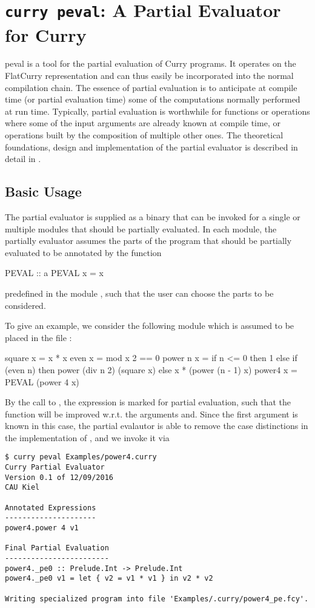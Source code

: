 \section{\texttt{curry peval}: A Partial Evaluator for Curry}
\label{sec-peval}

peval
is a tool for the partial evaluation of Curry programs.
It operates on the FlatCurry representation and can thus
easily be incorporated into the normal compilation chain.
The essence of partial evaluation is to anticipate at compile time
(or partial evaluation time) some of the computations
normally performed at run time.
Typically, partial evaluation is worthwhile for functions or
operations where some of the input arguments are already known at compile time,
or operations built by the composition of multiple other ones.
The theoretical foundations, design and implementation of
the partial evaluator is described in detail in \cite{Peemoeller2016}.

\subsection{Basic Usage}

The partial evaluator is supplied as a binary that can be invoked
for a single or multiple modules that should be partially evaluated.
In each module, the partially evaluator assumes the parts of the program
that should be partially evaluated to be annotated by the function
\begin{curry}
PEVAL :: a
PEVAL x = x
\end{curry}
predefined in the module ,
such that the user can choose the parts to be considered.

To give an example, we consider the following module which is assumed
to be placed in the file :
\begin{curry}
square  x = x * x
even    x = mod x 2 == 0
power n x = if n <= 0 then 1
                      else if (even n) then power (div n 2) (square x)
                                       else x * (power (n - 1) x)
power4  x = PEVAL (power 4 x)
\end{curry}
By the call to , the expression 
is marked for partial evaluation, such that the function 
will be improved w.r.t. the arguments  and.
Since the first argument is known in this case,
the partial evalautor is able to remove the case distinctions
in the implementation of , and we invoke it via
\begin{lstlisting}[mathescape=false]
$ curry peval Examples/power4.curry
Curry Partial Evaluator
Version 0.1 of 12/09/2016
CAU Kiel

Annotated Expressions
---------------------
power4.power 4 v1

Final Partial Evaluation
------------------------
power4._pe0 :: Prelude.Int -> Prelude.Int
power4._pe0 v1 = let { v2 = v1 * v1 } in v2 * v2

Writing specialized program into file 'Examples/.curry/power4_pe.fcy'.
\end{lstlisting}

